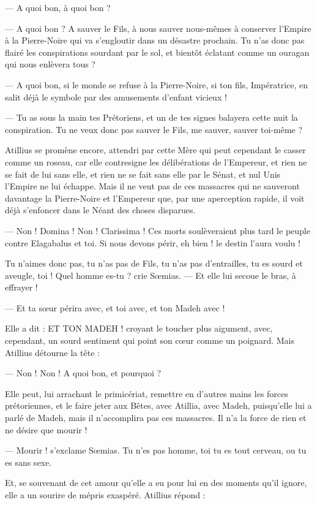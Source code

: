 \documentclass[a4paper, 11pt, oneside, polutonikogreek, french]{article}
\begin{document}
--- A quoi bon, à quoi bon ?

--- A quoi bon ? A sauver le Fils, à nous sauver nous-mêmes à conserver l'Empire à la Pierre-Noire qui va s'engloutir dans un désastre prochain. Tu n'as donc pas flairé les conspirations sourdant par le sol, et bientôt éclatant comme un ouragan qui nous enlèvera tous ?

--- A quoi bon, si le monde se refuse à la Pierre-Noire, si ton fils, Impératrice, en salit déjà le symbole par des amusements d'enfant vicieux !

--- Tu as sous la main tes Prétoriens, et un de tes signes balayera cette nuit la conspiration. Tu ne veux donc pas sauver le Fils, me sauver, sauver toi-même ?

Atillius se promène encore, attendri par cette Mère qui peut cependant le casser comme un roseau, car elle contresigne les délibérations de l'Empereur, et rien ne se fait de lui sans elle, et rien ne se fait sans elle par le Sénat, et nul Unis l'Empire ne lui échappe. Mais il ne veut pas de ces massacres qui ne sauveront davantage la Pierre-Noire et l'Empereur que, par une aperception rapide, il voit déjà s'enfoncer dans le Néant des choses disparues.

--- Non ! Domina ! Non ! Clarissima ! Ces morts soulèveraient plus tard le peuple contre Elagabalus et toi. Si nous devons périr, eh bien ! le destin l'aura voulu !

Tu n'aimes donc pas, tu n'as pas de Fils, tu n'as pas d'entrailles, tu es sourd et aveugle, toi ! Quel homme es-tu ? crie Sœmias. --- Et elle lui secoue le bras, à effrayer !

--- Et ta sœur périra avec, et toi avec, et ton Madeh avec !

Elle a dit : ET TON MADEH ! croyant le toucher plus aigument, avec, cependant, un sourd sentiment qui point son cœur comme un poignard. Mais Atillius détourne la tête :

--- Non ! Non ! A quoi bon, et pourquoi ?

Elle peut, lui arrachant le primicériat, remettre en d'autres mains les forces prétoriennes, et le faire jeter aux Bêtes, avec Atillia, avec Madeh, puisqu'elle lui a parlé de Madeh, mais il n'accomplira pas ces massacres. Il n'a la force de rien et ne désire que mourir !

--- Mourir ! s'exclame Sœmias. Tu n'es pas homme, toi tu es tout cerveau, ou tu es sans sexe.

Et, se souvenant de cet amour qu'elle a eu pour lui en des moments qu'il ignore, elle a un sourire de mépris exaspéré. Atillius répond :
\end{document}
